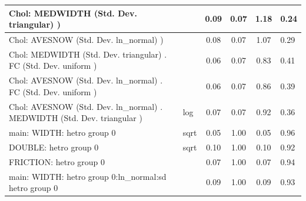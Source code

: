 \begin{table}
\begin{center}
\begin{tabular}{|l|l|c|c|c|l|}
			\hline
			 Chol: MEDWIDTH (Std. Dev. triangular) ) &  & 0.09 & 0.07 & 1.18 & 0.24 \\
			\hline
			 Chol: AVESNOW (Std. Dev. ln_normal) ) &  & 0.08 & 0.07 & 1.07 & 0.29 \\
			\hline
			 Chol: MEDWIDTH (Std. Dev. triangular) . FC (Std. Dev.   uniform ) &  & 0.06 & 0.07 & 0.83 & 0.41 \\
			\hline
			 Chol: AVESNOW (Std. Dev. ln_normal) . FC (Std. Dev.   uniform ) &  & 0.06 & 0.07 & 0.86 & 0.39 \\
			\hline
			 Chol: AVESNOW (Std. Dev. ln_normal) . MEDWIDTH (Std. Dev.   triangular ) & log & 0.07 & 0.07 & 0.92 & 0.36 \\
			\hline
			main: WIDTH: hetro group 0 & sqrt & 0.05 & 1.00 & 0.05 & 0.96 \\
			\hline
			DOUBLE: hetro group 0 & sqrt & 0.10 & 1.00 & 0.10 & 0.92 \\
			\hline
			FRICTION: hetro group 0 &  & 0.07 & 1.00 & 0.07 & 0.94 \\
			\hline
			main: WIDTH: hetro group 0:ln_normal:sd  hetro group 0 &  & 0.09 & 1.00 & 0.09 & 0.93 \\
			\hline
		\end{tabular}
	\end{center}
\end{table}